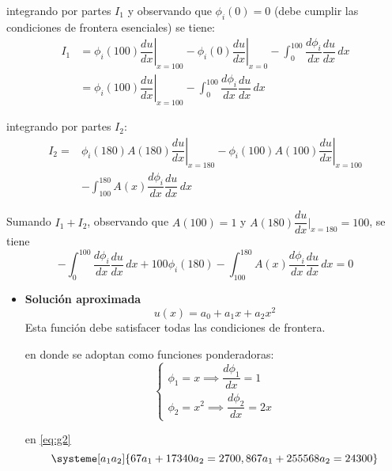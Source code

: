 \begin{example}
	integrando por partes $I_1$ y observando que $\phi_i(0) = 0$ (debe cumplir las condiciones de frontera esenciales) se tiene:
	\begin{equation*}
		\begin{split}
			I_1 &= \left. \phi_i(100) \dfrac{du}{dx} \right|_{x=100} - \left.\phi_i(0) \dfrac{du}{dx} \right|_{x=0} - \int_{0}^{100} \dfrac{d \phi_i}{dx} \dfrac{du}{dx}\, dx \\[5mm]
			&= \left. \phi_i(100) \dfrac{du}{dx} \right|_{x=100} - \int_{0}^{100} \dfrac{d \phi_i}{dx} \dfrac{du}{dx} \, dx
		\end{split}
	\end{equation*}
	
	integrando por partes $I_2$:
	\begin{equation*}
		\begin{split}
			I_2 =& \left. \phi_i(180) A(180) \dfrac{du}{dx} \right|_{x=180} - \left. \phi_i(100) A(100) \dfrac{du}{dx} \right|_{x=100} \\ &- \int_{100}^{180} A(x) \dfrac{d \phi_i}{dx} \dfrac{du}{dx} \, dx
		\end{split}
	\end{equation*}
	
	Sumando $I_1 + I_2$, observando que $A(100) = 1$ y $A(180) \dfrac{du}{dx} |_{x=180} = 100$, se tiene
	\begin{equation}
		- \int_{0}^{100} \dfrac{d \phi_i}{dx} \dfrac{du}{dx}\, dx + 100 \phi_i(180) - \int_{100}^{180} A(x) \dfrac{d \phi_i}{dx} \dfrac{du}{dx}\, dx = 0
		\label{eq:g2}
	\end{equation}
	
	\begin{itemize}
		\item \textbf{Solución aproximada}
		\begin{equation}
			u(x) = a_0 + a_1 x + a_2 x^2
		\end{equation}
		Esta función debe satisfacer todas las condiciones de frontera.
		
		en donde se adoptan como funciones ponderadoras:
		\begin{equation}
			\begin{cases}
				\phi_1 = x \implies \dfrac{d \phi_1}{dx} = 1 \\[4mm]
				\phi_2 = x^2 \implies \dfrac{d \phi_2}{dx} = 2x
			\end{cases}
		\end{equation}
		
		en \eqref{eq:g2}
		\begin{equation}
			\systeme[a_1 a_2]{67a_1 + 17340a_2 = 2700, 867a_1 + 255568a_2 = 24300}
			\label{eq:sis1}
		\end{equation}
		

\end{itemize}
\end{example}
